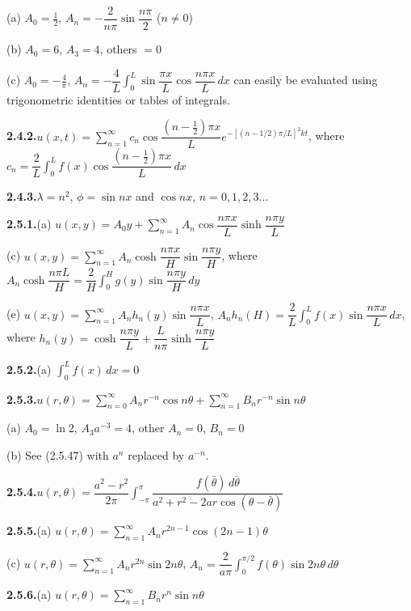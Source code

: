 \quad (a) $A_0 = \frac{1}{2}$, $A_n = -\dfrac{2}{n\pi}\sin\dfrac{n\pi}{2}$ \quad ($n \neq 0$)

\quad (b) $A_0 = 6$, $A_3 = 4$, others $= 0$

\quad (c) $A_0 = -\frac{4}{\pi}$, $A_n = -\dfrac{4}{L}\int_0^L \sin\dfrac{\pi x}{L}\cos\dfrac{n\pi x}{L}\,dx$ can easily be evaluated using
trigonometric identities or tables of integrals.

\medskip
\textbf{2.4.2.}\quad $u(x,t) = \sum_{n=1}^{\infty} c_n \cos\dfrac{(n-\frac{1}{2})\pi x}{L} e^{-[(n-1/2)\pi/L]^2 kt}$, where
$c_n = \dfrac{2}{L}\int_0^L f(x)\cos\dfrac{(n-\frac{1}{2})\pi x}{L}\,dx$

\medskip
\textbf{2.4.3.}\quad $\lambda = n^2$, $\phi = \sin nx$ and $\cos nx$, $n = 0, 1, 2, 3\ldots$

\medskip
\textbf{2.5.1.}\quad (a) $u(x,y) = A_0 y + \sum_{n=1}^{\infty} A_n \cos\dfrac{n\pi x}{L}\sinh\dfrac{n\pi y}{L}$

\quad (c) $u(x,y) = \sum_{n=1}^{\infty} A_n \cosh\dfrac{n\pi x}{H}\sin\dfrac{n\pi y}{H}$, where
$A_n\cosh\dfrac{n\pi L}{H} = \dfrac{2}{H}\int_0^H g(y)\sin\dfrac{n\pi y}{H}\,dy$

\quad (e) $u(x,y) = \sum_{n=1}^{\infty} A_n h_n(y)\sin\dfrac{n\pi x}{L}$, $A_n h_n(H) = \dfrac{2}{L}\int_0^L f(x)\sin\dfrac{n\pi x}{L}\,dx$,
where $h_n(y) = \cosh\dfrac{n\pi y}{L} + \dfrac{L}{n\pi}\sinh\dfrac{n\pi y}{L}$%

\medskip
\textbf{2.5.2.}\quad (a) $\int_0^L f(x)\,dx = 0$

\medskip
\textbf{2.5.3.}\quad $u(r,\theta) = \sum_{n=0}^{\infty} A_n r^{-n}\cos n\theta + \sum_{n=1}^{\infty} B_n r^{-n}\sin n\theta$

\quad (a) $A_0 = \ln 2$, $A_3 a^{-3} = 4$, other $A_n = 0$, $B_n = 0$

\quad (b) See (2.5.47) with $a^n$ replaced by $a^{-n}$.

\medskip
\textbf{2.5.4.}\quad $u(r,\theta) = \dfrac{a^2-r^2}{2\pi}\int_{-\pi}^{\pi}\dfrac{f(\bar\theta)\,d\bar\theta}{a^2+r^2-2ar\cos(\theta-\bar\theta)}$

\medskip
\textbf{2.5.5.}\quad (a) $u(r,\theta) = \sum_{n=1}^{\infty} A_n r^{2n-1}\cos(2n-1)\theta$

\quad (c) $u(r,\theta) = \sum_{n=1}^{\infty} A_n r^{2n}\sin 2n\theta$, $A_n = \dfrac{2}{a\pi}\int_0^{\pi/2} f(\theta)\sin 2n\theta\,d\theta$

\medskip
\textbf{2.5.6.}\quad (a) $u(r,\theta) = \sum_{n=1}^{\infty} B_n r^n \sin n\theta$

